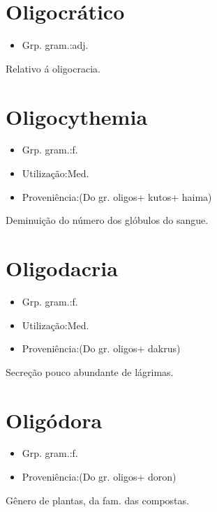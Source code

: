 \section{Oligocrático}
\begin{itemize}
\item {Grp. gram.:adj.}
\end{itemize}
Relativo á oligocracia.
\section{Oligocythemia}
\begin{itemize}
\item {Grp. gram.:f.}
\end{itemize}
\begin{itemize}
\item {Utilização:Med.}
\end{itemize}
\begin{itemize}
\item {Proveniência:(Do gr. \textunderscore oligos\textunderscore  + \textunderscore kutos\textunderscore  + \textunderscore haima\textunderscore )}
\end{itemize}
Deminuição do número dos glóbulos do sangue.
\section{Oligodacria}
\begin{itemize}
\item {Grp. gram.:f.}
\end{itemize}
\begin{itemize}
\item {Utilização:Med.}
\end{itemize}
\begin{itemize}
\item {Proveniência:(Do gr. \textunderscore oligos\textunderscore  + \textunderscore dakrus\textunderscore )}
\end{itemize}
Secreção pouco abundante de lágrimas.
\section{Oligódora}
\begin{itemize}
\item {Grp. gram.:f.}
\end{itemize}
\begin{itemize}
\item {Proveniência:(Do gr. \textunderscore oligos\textunderscore  + \textunderscore doron\textunderscore )}
\end{itemize}
Gênero de plantas, da fam. das compostas.
